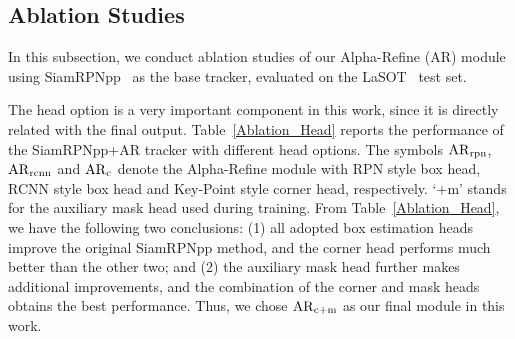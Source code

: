 \documentclass[final]{cvpr}
\begin{document}
\subsection{Ablation Studies}
In this subsection, we conduct ablation studies of our Alpha-Refine (AR) module using 
SiamRPNpp~\cite{SiamRPNplus} as the base tracker, evaluated on the LaSOT~\cite{LaSOT} test 
set. 
\begin{table}[h]
\caption{Analysis of different head options. 
The best three results are marked in \textbf{\textcolor[rgb]{1,0,0}{red}}, \textbf{\textcolor[rgb]{0,1,0}{green}} and \textbf{\textcolor[rgb]{0,0,1}{blue}} bold fonts, respectively.
Numbers are shown in percentage (\%). \label{Ablation_Head}}
\vspace{-2mm}
\begin{center}
\end{center}
\vspace{-4mm}

\end{table}


The head option is a very important component in this work, since it is directly related with the final output. 
Table~\ref{Ablation_Head} reports the performance of the SiamRPNpp+AR tracker with different head options. 
The symbols $\rm{AR}_{rpn}$, $\rm{AR}_{rcnn}$ and $\rm{AR}_{c}$ denote the Alpha-Refine module with RPN style 
box head, RCNN style box head and Key-Point style corner head, respectively.  
`+m' stands for the auxiliary mask head used during training. 
From Table~\ref{Ablation_Head}, we have the following two conclusions: 
(1) all adopted box estimation heads improve the original SiamRPNpp method, and the corner head performs much better than the other two;
and (2) the auxiliary mask head further makes additional improvements, and the combination of the corner and mask heads 
obtains the best performance. 
Thus, we chose $\rm{AR}_{c+m}$ as our final module in this work. 
\end{document}
